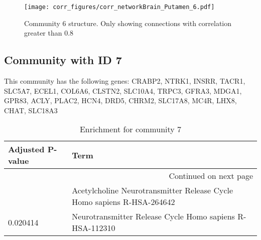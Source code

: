 \begin{figure}[h!]
\centering
\texttt{[image: corr\_figures/corr\_networkBrain\_Putamen\_6.pdf]}
\caption{Community 6 structure. Only showing connections with correlation greater than 0.8}
\end{figure}




\subsection*{Community with ID 7}
This community has the following genes: CRABP2, NTRK1, INSRR, TACR1, SLC5A7, ECEL1, COL6A6, CLSTN2, SLC10A4, TRPC3, GFRA3, MDGA1, GPR83, ACLY, PLAC2, HCN4, DRD5, CHRM2, SLC17A8, MC4R, LHX8, CHAT, SLC18A3
\\
\begin{longtable}{p{2.4cm}p{14.5cm}}
\caption{Enrichment for community 7}\\
\toprule
Adjusted \newline P-value &                                                                    Term \\
\midrule
\endhead
\midrule
\multicolumn{2}{r}{{Continued on next page}} \\
\midrule
\endfoot

\bottomrule
\endlastfoot
                 0.001368 &  Acetylcholine Neurotransmitter Release Cycle Homo sapiens R-HSA-264642 \\
                 0.020414 &                Neurotransmitter Release Cycle Homo sapiens R-HSA-112310 \\
\end{longtable}



